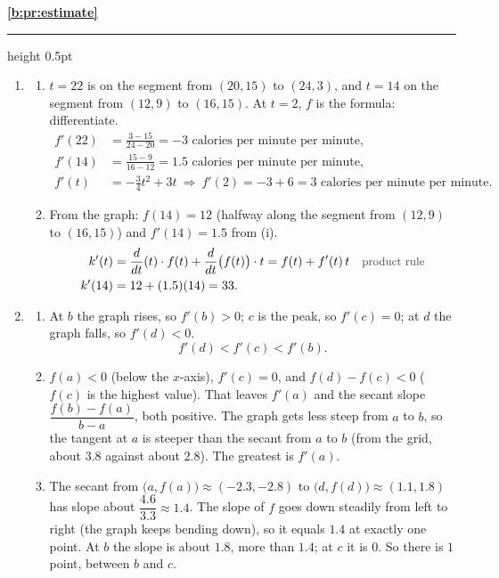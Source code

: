\documentclass[11pt,a4paper]{article}
\newcommand{\solitem}[2]{%
 \par\addvspace{16pt}\Needspace{10\baselineskip}%
 {\large\bfseries \ref{#1}}\par\nobreak\vspace{2pt}%
 {\color{rulegray}\hrule height 0.5pt}\nobreak\vspace{7pt}%
 #2\par}
\newcommand{\why}[1]{\text{\small\color{darkgray}#1}}
\newcommand{\imp}{\ \Longrightarrow\ }
\begin{document}
\solitem{b:pr:estimate}{%
\begin{enumerate}[label=(\alph*)]
 \item
 \begin{enumerate}[label=(\roman*)]
  \item $t=22$ is on the segment from $(20,15)$ to $(24,3)$, and $t=14$ on the segment from $(12,9)$ to $(16,15)$. At $t=2$, $f$ is the formula: differentiate.
  \begin{align*}
  f'(22)&=\frac{3-15}{24-20}=-3\text{ calories per minute per minute},\\
  f'(14)&=\frac{15-9}{16-12}=1.5\text{ calories per minute per minute},\\
  f'(t)&=-\frac34t^2+3t\imp f'(2)=-3+6=3\text{ calories per minute per minute}.
  \end{align*}
  \item From the graph: $f(14)=12$ (halfway along the segment from $(12,9)$ to $(16,15)$) and $f'(14)=1.5$ from (i).
  \begin{align*}
  k'(t)&=\frac{d}{dt}(t)\cdot f(t)+\frac{d}{dt}\bigl(f(t)\bigr)\cdot t=f(t)+f'(t)\,t &&\why{product rule}\\
  k'(14)&=12+(1.5)(14)=33.
  \end{align*}
 \end{enumerate}
 \item
 \begin{enumerate}[label=(\roman*)]
  \item At $b$ the graph rises, so $f'(b)>0$; $c$ is the peak, so $f'(c)=0$; at $d$ the graph falls, so $f'(d)<0$.
  \[
  f'(d)<f'(c)<f'(b).
  \]
  \item $f(a)<0$ (below the $x$-axis), $f'(c)=0$, and $f(d)-f(c)<0$ ($f(c)$ is the highest value). That leaves $f'(a)$ and the secant slope $\dfrac{f(b)-f(a)}{b-a}$, both positive. The graph gets less steep from $a$ to $b$, so the tangent at $a$ is steeper than the secant from $a$ to $b$ (from the grid, about $3.8$ against about $2.8$). The greatest is $f'(a)$.
  \item The secant from $\bigl(a,f(a)\bigr)\approx(-2.3,-2.8)$ to $\bigl(d,f(d)\bigr)\approx(1.1,1.8)$ has slope about $\dfrac{4.6}{3.3}\approx1.4$. The slope of $f$ goes down steadily from left to right (the graph keeps bending down), so it equals $1.4$ at exactly one point. At $b$ the slope is about $1.8$, more than $1.4$; at $c$ it is $0$. So there is $1$ point, between $b$ and $c$.
 \end{enumerate}
\end{enumerate}
}
\end{document}
